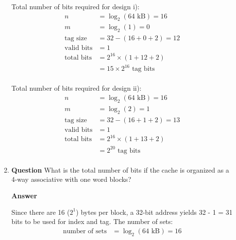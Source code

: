 \documentclass[10pt]{extarticle}
\begin{document}
\begin{enumerate}
\begin{enumerate}
            Total number of bits required for design i):
            \begin{equation*}
                \begin{split}
                    n & = \log_2(\text{64 kB}) = 16 \\
                    m & = \log_2(\text{1}) = 0 \\
                    \text{tag size} & = 32 - (16 + 0 + 2) = 12 \\
                    \text{valid bits} & = 1 \\
                    \text{total bits} & = 2^{16} \times (1 + 12 + 2) \\
                    & = 15 \times 2^{16} \text{ tag bits} \\
                \end{split}
            \end{equation*}

            Total number of bits required for design ii):
            \begin{equation*}
                \begin{split}
                    n & = \log_2(\text{64 kB}) = 16 \\
                    m & = \log_2(\text{2}) = 1 \\
                    \text{tag size} & = 32 - (16 + 1 + 2) = 13 \\
                    \text{valid bits} & = 1 \\
                    \text{total bits} & = 2^{16} \times (1 + 13 + 2) \\
                    & = 2^{20} \text{ tag bits} \\
                \end{split}
            \end{equation*}

            \item \textbf{Question} What is the total number of bits if the
            cache is organized as a 4-way associative with one word blocks?

            \textbf{Answer}

            Since there are 16 ($2^1$) bytes per block, a 32-bit address yields
            32 - 1 = 31 bits to be used for index and tag. The number of sets:
            \begin{equation*}
                \begin{split}
                    \text{number of sets} & = \log_2(\text{64 kB}) = 16 \\
                \end{split}
            \end{equation*}


\end{enumerate}
\end{enumerate}
\end{document}

